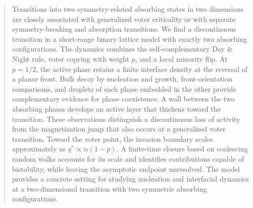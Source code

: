 \begin{abstract}
Transitions into two symmetry-related absorbing states in two dimensions are closely
associated with generalized voter criticality or with separate symmetry-breaking and
absorption transitions. We find a discontinuous transition in a short-range binary
lattice model with exactly two absorbing configurations. The dynamics combines the
self-complementary Day \& Night rule, voter copying with weight $p$, and a local minority
flip. At $p=1/2$, the active phase retains a finite interface density at the reversal of
a planar front. Bulk decay by nucleation and growth, front-orientation comparisons,
and droplets of each phase embedded in the other provide complementary evidence for
phase coexistence. A wall between the two absorbing phases develops an active layer
that thickens toward the transition. These observations distinguish a discontinuous
loss of activity from the magnetization jump that also occurs at a generalized voter
transition. Toward the voter point, the invasion boundary scales approximately as
$q^*\propto\alpha(1-p)$. A finite-time closure based on coalescing random walks accounts
for its scale and identifies contributions capable of bistability, while leaving the
asymptotic endpoint unresolved. The model provides a concrete setting for studying
nucleation and interfacial dynamics at a two-dimensional transition with two symmetric
absorbing configurations.
\end{abstract}
